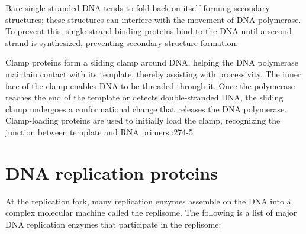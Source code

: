 Bare single-stranded DNA tends to fold back on itself forming secondary structures; these structures can interfere with the movement of DNA polymerase. To prevent this, single-strand binding proteins bind to the DNA until a second strand is synthesized, preventing secondary structure formation.

Clamp proteins form a sliding clamp around DNA, helping the DNA polymerase maintain contact with its template, thereby assisting with processivity. The inner face of the clamp enables DNA to be threaded through it. Once the polymerase reaches the end of the template or detects double-stranded DNA, the sliding clamp undergoes a conformational change that releases the DNA polymerase. Clamp-loading proteins are used to initially load the clamp, recognizing the junction between template and RNA primers.:274-5

\hypertarget{dna-replication-proteins}{%
\section{DNA replication proteins}\label{dna-replication-proteins}}

At the replication fork, many replication enzymes assemble on the DNA into a complex molecular machine called the replisome. The following is a list of major DNA replication enzymes that participate in the replisome:

